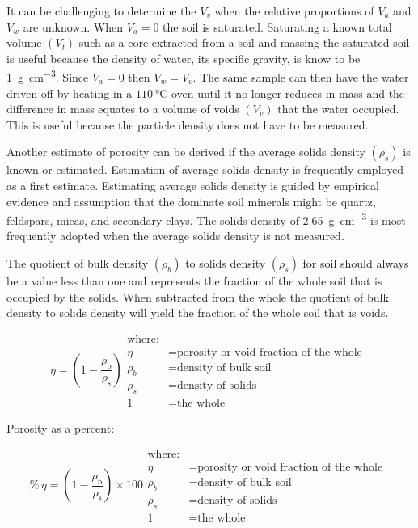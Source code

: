 \documentclass[a5paper]{report}
\begin{document}
It can be challenging to determine the $V_v$ when the relative proportions of $V_a$ and $V_w$ are unknown. When $V_a = 0$ the soil is saturated. Saturating a known total volume $\left(V_t\right)$  such as a core extracted from a soil and massing the saturated soil is useful because the density of water, its specific gravity, is know to be \qty{1}{\gram\per\cubic\centi\metre}. Since $V_a=0$ then $V_w=V_v$. The same sample can then have the water driven off by heating in a $\qty{110}{\degreeCelsius}$ oven until it no longer reduces in mass and the difference in mass equates to a volume of voids $\left(V_v\right)$ that the water occupied. This is useful because the particle density does not have to be measured.

Another estimate of porosity can be derived if the average solids density $\left(\rho_s\right)$ is known or estimated. Estimation of average solids density is frequently employed as a first estimate. Estimating average solids density is guided by empirical evidence and assumption that the dominate soil minerals might be quartz, feldspars, micas, and secondary clays. The solids density of \qty{2.65}{\gram\per\cubic\centi\metre} is most frequently adopted when the average solids density is not measured.

The quotient of bulk density $\left(\rho_b\right)$ to solids density $\left(\rho_s\right)$ for soil should always be a value less than one and represents the fraction of the whole soil that is occupied by the solids. When subtracted from the whole the quotient of bulk density to solids density will yield the fraction of the whole soil that is voids.

\begin{equation}
    \eta =\left(1-\frac{\rho_{\text{b}}}{\rho_{\text{s}}}\right)
    \begin{aligned}
        \text{where:}\\
        \eta &= \text{porosity or void fraction of the whole }\\
        \rho_b &= \text{density of bulk soil}\\
        \rho_s &= \text{density of solids}\\
        1 &= \text{the whole}
    \end{aligned}
\end{equation}

Porosity as a percent:

\begin{equation}
    \%\,\eta =\left(1-\frac{\rho_{\text{b}}}{\rho_{\text{s}}}\right) \times 100
    \begin{aligned}
        \text{where:}\\
        \eta &= \text{porosity or void fraction of the whole }\\
        \rho_b &= \text{density of bulk soil}\\
        \rho_s &= \text{density of solids}\\
        1 &= \text{the whole}
    \end{aligned}
\end{equation}
\end{document}
